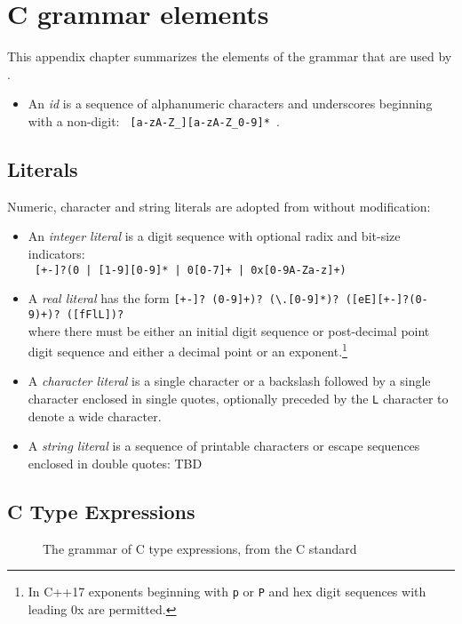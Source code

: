 \section{C grammar elements}
\label{sec:cgrammar}

This appendix chapter summarizes the elements of the \lang grammar that are used by \NAME.


\begin{itemize}
  \item  An \textit{id} is a sequence of alphanumeric characters and underscores beginning with a non-digit:  \lstinline| [a-zA-Z_][a-zA-Z_0-9]* |.
\end{itemize}

\subsection{Literals}

Numeric, character and string literals are adopted from \lang without modification:
\begin{itemize}
  \item An \textit{integer literal} is a digit sequence with optional radix and bit-size indicators: \\ \lstinline! [+-]?(0 | [1-9][0-9]* | 0[0-7]+ | 0x[0-9A-Za-z]+) !
  \item A \textit{real literal} has the form \lstinline![+-]? (0-9]+)? (\.[0-9]*)? ([eE][+-]?(0-9)+)? ([fFlL])? ! \\where there must be either an initial digit sequence or post-decimal point digit sequence and either a decimal point or an exponent.\footnote{In C++17 exponents beginning with \lstinline|p| or \lstinline|P| and hex digit sequences with leading 0x are permitted.}
  \item A \textit{character literal} is a single character or a backslash followed by a single character enclosed in single quotes, optionally 
  preceded by the \lstinline|L| character to denote a wide character.
  \item A \textit{string literal} is a sequence of printable characters or escape sequences enclosed in double quotes: TBD
\end{itemize}


\subsection{C Type Expressions}

\begin{figure}[t]
  \begin{cadre}
    
  \end{cadre}
  \caption{The grammar of C type expressions, from the C standard}
\label{fig:gram:ctype}
\end{figure}


